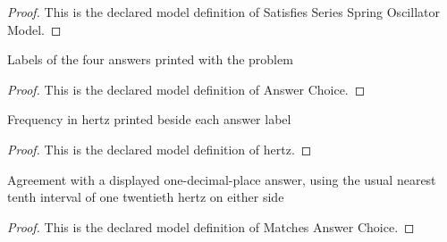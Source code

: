 \begin{proof}
  This is the declared model definition of Satisfies Series Spring Oscillator Model.
\end{proof}
\begin{definition}
  \label{def:physics:phyx-mini-0256:phyxminiproblems-problemphyxmini0256-answerchoice}
  Labels of the four answers printed with the problem
\end{definition}
\begin{proof}
  This is the declared model definition of Answer Choice.
\end{proof}
\begin{definition}[hertz]
  \label{def:physics:phyx-mini-0256:phyxminiproblems-problemphyxmini0256-answerchoice-hertz}
  Frequency in hertz printed beside each answer label
\end{definition}
\begin{proof}
  This is the declared model definition of hertz.
\end{proof}
\begin{definition}
  \label{def:physics:phyx-mini-0256:phyxminiproblems-problemphyxmini0256-matchesanswerchoice}
  Agreement with a displayed one-decimal-place answer, using the usual nearest tenth interval of one twentieth hertz on either side
\end{definition}
\begin{proof}
  This is the declared model definition of Matches Answer Choice.
\end{proof}
